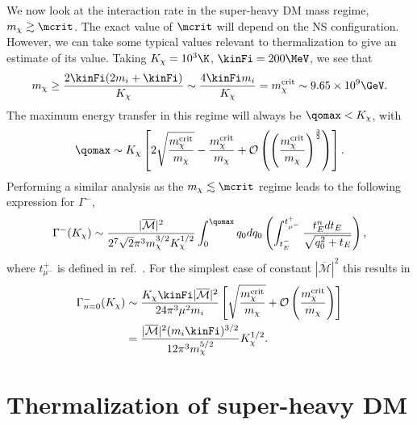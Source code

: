 We now look at the interaction rate in the super-heavy DM mass regime, $m_\chi \gtrsim \mcrit$.
The exact value of $\mcrit$ will depend on the NS configuration. However, we can take some typical values relevant to thermalization to give an estimate of its value. Taking $K_\chi=10^3\K$, $\kinFi=200\MeV$, we see that
\begin{equation}
    m_\chi \ge \frac{2\kinFi(2m_i+\kinFi)}{ K_\chi} \sim \frac{4\kinFi m_i}{K_\chi} = m_\chi^{\rm crit}\sim 9.65\times10^9\GeV. 
\end{equation}
The maximum energy transfer in this regime will always be $\qomax<K_\chi$, with
\begin{equation}
    \qomax\sim K_\chi\left[2\sqrt{\frac{m_\chi^{\rm crit}}{m_\chi }} - \frac{m_\chi^{\rm crit}}{m_\chi } +\mathcal{O}\left(\left(\frac{m_\chi^{\rm crit}}{m_\chi}\right)^{\frac{3}{2}}\right)\right].
 \end{equation}
Performing a similar analysis as the $m_\chi \lesssim \mcrit$ regime leads to the following expression for $\Gamma^-$,
\begin{equation}
\Gamma^{-}(K_\chi) \sim \frac{|\overline{\mathcal{M}}|^2}{2^7\sqrt{2}\pi^3m_\chi^{3/2}K_\chi^{1/2}}\int_0^{	\qomax}q_0 dq_0 \left(\int_{t_{E}^{-}}^{t_{\mu^-}^{+}} \frac{t_E^n dt_E }{\sqrt{q_0^2+t_E}} \right),  
\end{equation} 
where $t_{\mu^-}^+$ is defined in ref.~\cite{Bell:2020jou_sep_ImprovedTreatmentDark}. 
For the simplest case of constant $|\overline{\mathcal{M}}|^2$ this results in 
\begin{align}
\Gamma^{-}_{n=0}(K_\chi) & \sim  
\frac{K_\chi \kinFi |\overline{\mathcal{M}}|^2}{24\pi^3\mu^2m_i}\left[\sqrt{\frac{m_\chi^{\rm crit}}{m_\chi}}+\mathcal{O}\left(\frac{m_\chi^{\rm crit}}{m_\chi}\right)\right] \nonumber\\
& = \frac{|\overline{\mathcal{M}}|^2(m_i\kinFi)^{3/2}}{12 \pi^3m_\chi^{5/2}}K_\chi^{1/2}.\label{eq:intraten0largem}
\end{align}



\section{Thermalization of super-heavy DM}
\label{sec:thermsuperheavy}



